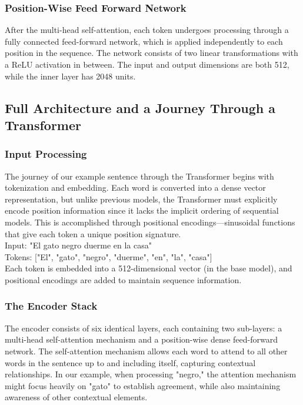 \subsubsection{Position-Wise Feed Forward Network}
After the multi-head self-attention, each token undergoes processing through a fully connected feed-forward network, which is applied independently to each position in the sequence. The network consists of two linear transformations with a ReLU activation in between. The input and output dimensions are both 512, while the inner layer has 2048 units.

\subsection{Full Architecture and a Journey Through a Transformer}

\subsubsection{Input Processing}
The journey of our example sentence through the Transformer begins with tokenization and embedding. Each word is converted into a dense vector representation, but unlike previous models, the Transformer must explicitly encode position information since it lacks the implicit ordering of sequential models. This is accomplished through positional encodings—sinusoidal functions that give each token a unique position signature. \\

Input: "El gato negro duerme en la casa" \\ 

Tokens: ["El", "gato", "negro", "duerme", "en", "la", "casa"] \\

Each token is embedded into a 512-dimensional vector (in the base model), and positional encodings are added to maintain sequence information.

\subsubsection{The Encoder Stack}
The encoder consists of six identical layers, each containing two sub-layers: a multi-head self-attention mechanism and a position-wise dense feed-forward network. The self-attention mechanism allows each word to attend to all other words in the sentence up to and including itself, capturing contextual relationships. In our example, when processing "negro," the attention mechanism might focus heavily on "gato" to establish agreement, while also maintaining awareness of other contextual elements. 

